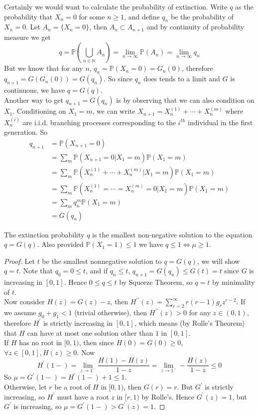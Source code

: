 Certainly we would want to calculate the probability of extinction.
Write $q$ as the probability that $X_n=0$ for some $n\ge 1$, and define $q_n$ be the probability of $X_n=0$.
Let $A_n=\{X_n=0\}$, then $A_n\subset A_{n+1}$ and by continuity of probability measure we get
$$q=\mathbb P\left( \bigcup_{n\in\mathbb N}A_n \right)=\lim_{n\to\infty}\mathbb P(A_n)=\lim_{n\to\infty}q_n$$
But we know that for any $n$, $q_n=\mathbb P(X_n=0)=G_n(0)$, therefore $q_{n+1}=G(G_n(0))=G(q_n)$.
So since $q_n$ does tends to a limit and $G$ is continuous, we have $q=G(q)$.\\
Another way to get $q_{n+1}=G(q_n)$ is by observing that we can also condition on $X_1$.
Conditioning on $X_1=m$, we can write $X_{n+1}=X_n^{(1)}+\cdots+X_n^{(m)}$ where $X_n^{(i)}$ are i.i.d. branching processes corresponding to the $i^{th}$ individual in the first generation.
So
\begin{align*}
    q_{n+1}&=\mathbb P(X_{n+1}=0)\\
    &=\sum_m\mathbb P(X_{n+1}=0|X_1=m)\mathbb P(X_1=m)\\
    &=\sum_m\mathbb P(X_n^{(1)}+\cdots+X_n^{(m)}|X_1=m)\mathbb P(X_1=m)\\
    &=\sum_m\mathbb P(X_n^{(1)}=\cdots=X_n^{(m)}=0|X_1=m)\mathbb P(X_1=m)\\
    &=\sum_mq_n^m\mathbb P(X_1=m)\\
    &=G(q_n)
\end{align*}
\begin{theorem}
    The extinction probability $q$ is the smallest non-negative solution to the equation $q=G(q)$.
    Also provided $\mathbb P(X_1=1)\le1$ we have $q\le1\iff \mu\ge1$.
\end{theorem}
\begin{proof}
    Let $t$ be the smallest nonnegative solution to $q=G(q)$, we will show $q=t$.
    Note that $q_0=0\le t$, and if $q_n\le t$, $q_{n+1}=G(q_n)\le G(t)=t$ since $G$ is increasing in $[0,1]$.
    Hence $0\le q\le t$ by Squeeze Theorem, so $q=t$ by minimality of $t$.\\
    Now consider $H(z)=G(z)-z$, then $H^{\prime\prime}(z)=\sum_{r=2}^\infty r(r-1)g_rz^{r-2}$.
    If we assume $g_0+g_1<1$ (trivial otherwise), then $H^{\prime\prime}(z)>0$ for any $z\in (0,1)$, therefore $H^\prime$ is strictly increasing in $[0,1]$, which means (by Rolle's Theorem) that $H$ can have at most one solution other than $1$ in $[0,1]$.\\
    If $H$ has no root in $[0,1)$, then since $H(0)=G(0)\ge 0$, $\forall z\in [0,1],H(z)\ge 0$.
    Now
    $$H^\prime(1-)=\lim_{z\to 1^-}\frac{H(1)-H(z)}{1-z}=\lim_{z\to 1^-}-\frac{H(z)}{1-z}\le 0$$
    So $\mu=G^\prime(1-)=H^\prime(1-)+1\le1$.\\
    Otherwise, let $r$ be a root of $H$ in $[0,1)$, then $G(r)=r$.
    But $G^\prime$ is strictly increasing, so $H^\prime$ must have a root $z$ in $[r,1)$ by Rolle's.
    Hence $G^\prime(z)=1$, but $G^\prime$ is increasing, so $\mu=G^\prime(1-)>G^\prime(z)=1$.
\end{proof}
